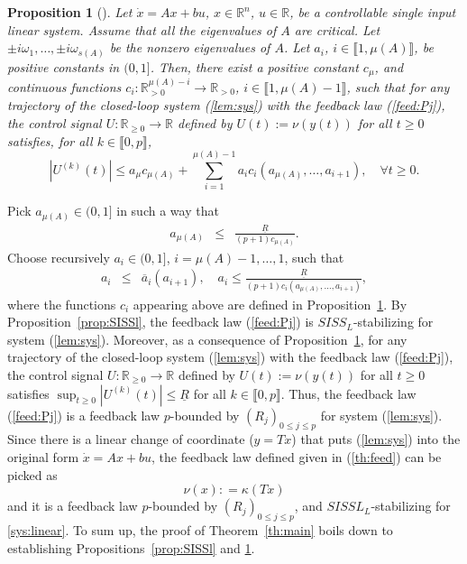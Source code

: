 \documentclass[letterpaper, 10pt]{article}
\newtheorem{propo}{Proposition}
\newcommand{\rref}[1]{(\ref{#1})}
\newcommand{\abs}[1]{\left| #1 \right|}
\newcommand{\reels}{\mathbb{R}}
\begin{document}
\begin{propo}[]
\label{prop:bound:U}
Let $\dot{x}=Ax + b u $, $x \in \reels^n$, $u\in\reels$, be a controllable single input linear system. Assume that all the eigenvalues of $A$ are critical. Let $ \pm i \omega_1, \ldots , \pm i \omega_{s(A)} $ be the nonzero eigenvalues of $A$. Let $a_i$, $i \in \llbracket 1 , \mu(A) \rrbracket $, be positive constants in $(0,1]$.
Then, there exist a positive constant $c_\mu$, and continuous functions $c_i : \reels^{\mu(A) -i}_{>0 } \to \reels_{>0} $, $i \in \llbracket 1 , \mu(A) -1 \rrbracket$, such that for any trajectory of the closed-loop system \rref{lem:sys} with the feedback law \rref{feed:Pj}, the control signal $U : \reels_{\geq 0} \rightarrow  \reels $ defined by $U(t) := \nu (y(t)) $ for all $t \geq 0$ satisfies, for all $k \in \llbracket 0 ,p \rrbracket $,
\begin{equation*}
\abs{ U^{(k)}(t)} \leq a_\mu c_{\mu(A)}+ \sum\limits_{i=1}^{ \mu(A) - 1 } a_i c_i( a_{\mu(A)} , \ldots , a_{i+1} ), \quad \forall t \geq 0. 
\end{equation*}
\end{propo}

Pick $a_{\mu(A)} \in (0, 1]$ in such a way that
\begin{eqnarray*}
a_{\mu(A)} & \leq & \frac{\underline{R}}{(p+1) c_{\mu(A)}}.
\end{eqnarray*} 
Choose recursively $a_i \in (0, 1]$, $i= \mu(A)- 1 , \ldots , 1$, such that
\begin{eqnarray*}
a_{i} & \leq &  \overline{a}_{i} (a_{i+1}), \quad a_{i}  \leq  \frac{\underline{R}}{(p+1) c_i( a_{\mu(A)} , \ldots , a_{i+1} )},
\end{eqnarray*} 
where the functions $c_i$ appearing above are defined in Proposition~\ref{prop:bound:U}.
By Proposition~\ref{prop:SISSl}, the feedback law \rref{feed:Pj} is $SISS_L$-stabilizing for system \rref{lem:sys}. Moreover, as a consequence of Proposition~\ref{prop:bound:U}, for any trajectory of the closed-loop system \rref{lem:sys} with the feedback law \rref{feed:Pj}, the control signal $U : \reels_{\geq 0} \rightarrow  \reels $ defined by $U(t) := \nu (y(t)) $ for all $t \geq 0$ satisfies $\sup_{t\geq 0}\abs{U^{(k)}(t)} \leq  \underline{R}$ for all $k \in \llbracket 0 ,p \rrbracket $. Thus, the feedback law \rref{feed:Pj} is a  feedback law $p$-bounded by $(R_j)_{0 \leq j \leq p}$ for system \rref{lem:sys}. Since there is a linear change of coordinate ($y=Tx$) that puts \rref{lem:sys} into the original form $\dot{x}=Ax + b u$, the feedback law defined given in \rref{th:feed} can be picked as
\begin{equation*}
\nu(x) : = \kappa(T x)
\end{equation*} 
and it is a feedback law $p$-bounded by $(R_j)_{0 \leq j \leq p}$, and  $SISSL_L$-stabilizing for \eqref{sys:linear}. To sum up, the proof of Theorem~\ref{th:main} boils down to establishing Propositions~\ref{prop:SISSl} and \ref{prop:bound:U}.
\end{document}
